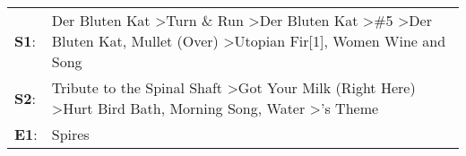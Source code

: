 \begin{supertabular}{p{0.03\textwidth}p{0.92\textwidth}}
 \textbf{S1}:  &  Der Bluten Kat\textsuperscript{} \textgreater \enspace Turn \& Run\textsuperscript{} \textgreater \enspace Der Bluten Kat\textsuperscript{} \textgreater \enspace \#5\textsuperscript{} \textgreater \enspace Der Bluten Kat\textsuperscript{}, \enspace Mullet (Over)\textsuperscript{} \textgreater \enspace Utopian Fir[1]\textsuperscript{}, \enspace Women Wine and Song\textsuperscript{}  \enspace  \\
 \textbf{S2}:  &                                                                                            Tribute to the Spinal Shaft\textsuperscript{} \textgreater \enspace Got Your Milk (Right Here)\textsuperscript{} \textgreater \enspace Hurt Bird Bath\textsuperscript{}, \enspace Morning Song\textsuperscript{}, \enspace Water\textsuperscript{} \textgreater {}'s Theme\textsuperscript{}  \enspace  \\
 \textbf{E1}:  &                                                                                                                                                                                                                                                                                                                                                                         Spires\textsuperscript{}  \enspace  \\
\end{supertabular}
